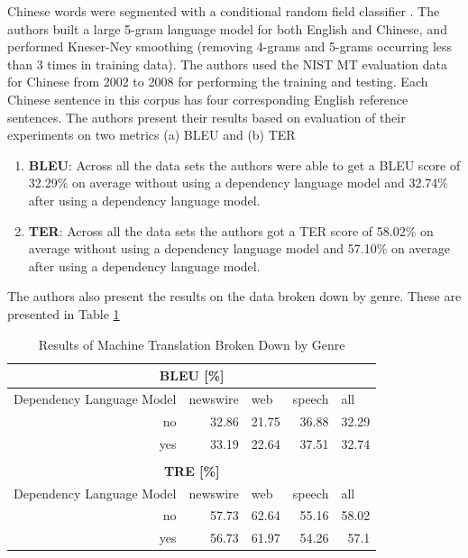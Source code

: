 \documentclass[10pt, letter]{article}
\begin{document}
Chinese words were segmented with a conditional random field classifier \cite{chang2008optimizing}. The authors built a large 5-gram language model for both English and Chinese, and performed Kneser-Ney smoothing (removing 4-grams and 5-grams occurring less than 3 times in training data). The authors used the NIST MT evaluation data for Chinese from 2002 to 2008 for performing the training and testing. Each Chinese sentence in this corpus has four corresponding English reference sentences. The authors present their results based on evaluation of their experiments on two metrics (a) BLEU and (b) TER
\begin{enumerate}
\item \textbf{BLEU}: Across all the data sets the authors were able to get a BLEU score of 32.29\% on average without using a dependency language model and 32.74\% after using a dependency language model.
\item \textbf{TER}: Across all the data sets the authors got a TER score of 58.02\% on average without using a dependency language model and 57.10\% on average after using a dependency language model.
\end{enumerate}

The authors also present the results on the data broken down by genre. These are presented in Table \ref{broken}
\begin{table}[htbp]
\centering
\begin{tabular}{|r|l|l|l|l|}
\hline
\multicolumn{ 5}{|c|}{\textbf{BLEU [\%]}} \\ \hline
\multicolumn{1}{|l|}{Dependency Language Model} & newswire & web & speech & all \\ \hline
no & \multicolumn{1}{r|}{32.86} & \multicolumn{1}{r|}{21.75} & \multicolumn{1}{r|}{36.88} & \multicolumn{1}{r|}{32.29} \\ \hline
yes & \multicolumn{1}{r|}{33.19} & \multicolumn{1}{r|}{22.64} & \multicolumn{1}{r|}{37.51} & \multicolumn{1}{r|}{32.74} \\ \hline
\multicolumn{1}{|l|}{} &  &  &  &  \\ \hline
\multicolumn{ 5}{|c|}{\textbf{TRE [\%]}} \\ \hline
\multicolumn{1}{|l|}{Dependency Language Model} & newswire & web & speech & all \\ \hline
no & \multicolumn{1}{r|}{57.73} & \multicolumn{1}{r|}{62.64} & \multicolumn{1}{r|}{55.16} & \multicolumn{1}{r|}{58.02} \\ \hline
yes & \multicolumn{1}{r|}{56.73} & \multicolumn{1}{r|}{61.97} & \multicolumn{1}{r|}{54.26} & \multicolumn{1}{r|}{57.1} \\ \hline
\end{tabular}
\caption{Results of Machine Translation Broken Down by Genre}
\label{broken}
\end{table}
\end{document}
